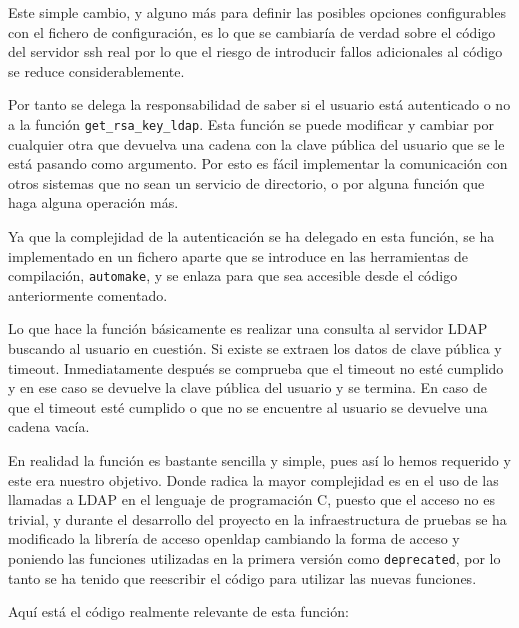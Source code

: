     Este simple cambio, y alguno más para definir las posibles opciones
    configurables con el fichero de configuración, es lo que se cambiaría
    de verdad sobre el código del servidor ssh real por lo que el riesgo
    de introducir fallos adicionales al código se reduce considerablemente.

    Por tanto se delega la responsabilidad de saber si el usuario está
    autenticado o no a la función \texttt{get\_rsa\_key\_ldap}. Esta
    función se puede modificar y cambiar por cualquier otra que devuelva
    una cadena con la clave pública del usuario que se le está pasando como
    argumento. Por esto es fácil implementar la comunicación con otros
    sistemas que no sean un servicio de directorio, o por alguna función
    que haga alguna operación más.

    Ya que la complejidad de la autenticación se ha delegado en esta
    función, se ha implementado en un fichero aparte que se introduce en
    las herramientas de compilación, \texttt{automake}, y se enlaza para
    que sea accesible desde el código anteriormente comentado.

    Lo que hace la función básicamente es realizar una consulta al servidor
    LDAP buscando al usuario en cuestión. Si existe se extraen los
    datos de clave pública y timeout. Inmediatamente después se comprueba
    que el timeout no esté cumplido y en ese caso se devuelve la clave
    pública del usuario y se termina. En caso de que el timeout esté
    cumplido o que no se encuentre al usuario se devuelve una cadena
    vacía.

    En realidad la función es bastante sencilla y simple, pues así lo hemos
    requerido y este era nuestro objetivo. Donde radica la mayor
    complejidad es en el uso de las llamadas a LDAP en el lenguaje de
    programación C, puesto que el acceso no es trivial, y durante el
    desarrollo del proyecto en la infraestructura de pruebas se ha
    modificado la librería de acceso openldap cambiando la forma de
    acceso y poniendo las funciones utilizadas en la primera versión como
    \texttt{deprecated}, por lo tanto se ha tenido que reescribir el código
    para utilizar las nuevas funciones.

    Aquí está el código realmente relevante de esta función:

